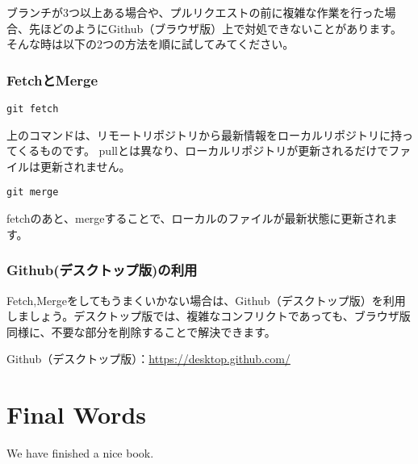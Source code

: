\documentclass[
]{book}
\begin{document}
ブランチが3つ以上ある場合や、プルリクエストの前に複雑な作業を行った場合、先ほどのようにGithub（ブラウザ版）上で対処できないことがあります。
そんな時は以下の2つの方法を順に試してみてください。

\hypertarget{fetchux3068merge}{%
\subsection{FetchとMerge}\label{fetchux3068merge}}

\begin{verbatim}
git fetch
\end{verbatim}

上のコマンドは、リモートリポジトリから最新情報をローカルリポジトリに持ってくるものです。
pullとは異なり、ローカルリポジトリが更新されるだけでファイルは更新されません。

\begin{verbatim}
git merge
\end{verbatim}

fetchのあと、mergeすることで、ローカルのファイルが最新状態に更新されます。

\hypertarget{githubux30c7ux30b9ux30afux30c8ux30c3ux30d7ux7248ux306eux5229ux7528}{%
\subsection{Github(デスクトップ版)の利用}\label{githubux30c7ux30b9ux30afux30c8ux30c3ux30d7ux7248ux306eux5229ux7528}}

Fetch,Mergeをしてもうまくいかない場合は、Github（デスクトップ版）を利用しましょう。デスクトップ版では、複雑なコンフリクトであっても、ブラウザ版同様に、不要な部分を削除することで解決できます。

Github（デスクトップ版）：\url{https://desktop.github.com/}

\hypertarget{final-words}{%
\chapter{Final Words}\label{final-words}}

We have finished a nice book.

  
\end{document}
